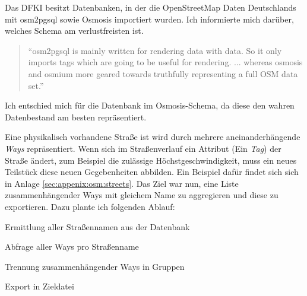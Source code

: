 Das DFKI besitzt Datenbanken, in der die OpenStreetMap Daten Deutschlands mit osm2pgsql sowie Osmosis importiert wurden.
Ich informierte mich darüber, welches Schema am verlustfreisten ist.
\begin{quote}
``osm2pgsql is mainly written for rendering data with data. So it only imports tags which are going to be useful for rendering. ... whereas osmosis and osmium more geared towards truthfully representing a full OSM data set.'' \cite{WEB:Giswiki:Osm2pgsql:2015}
\end{quote}

Ich entschied mich für die Datenbank im Osmosis-Schema, da diese den wahren Datenbestand am besten repräsentiert.

Eine physikalisch vorhandene Straße ist wird durch mehrere aneinanderhängende \textit{Ways} repräsentiert.
Wenn sich im Straßenverlauf ein Attribut (Ein \textit{Tag}) der Straße ändert, zum Beispiel die zulässige Höchstgeschwindigkeit, muss ein neues Teilstück diese neuen Gegebenheiten abbilden.
Ein Beispiel dafür findet sich sich in Anlage \ref{sec:appenix:osm:streets}.
Das Ziel war nun, eine Liste zusammenhängender Ways mit gleichem Name zu aggregieren und diese zu exportieren. Dazu plante ich folgenden Ablauf:

\begin{compactenum}
  \item Ermittlung aller Straßennamen aus der Datenbank
  \item Abfrage aller Ways pro Straßenname
  \item Trennung zusammenhängender Ways in Gruppen
  \item Export in Zieldatei
\end{compactenum}

